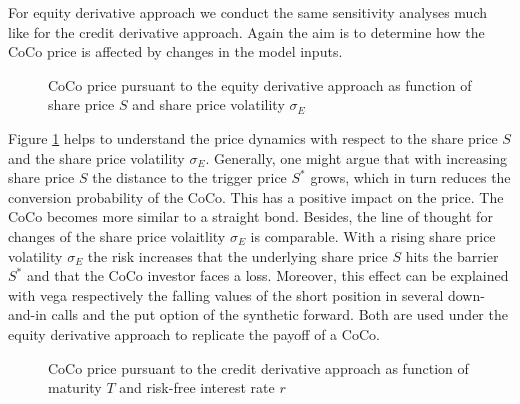 For equity derivative approach we conduct the same sensitivity analyses much like for the credit derivative approach. Again the aim is to determine how the CoCo price is affected by changes in the model inputs. 

\begin{figure}[H]
\centering
    \caption[CoCo price pursuant to the equity derivative approach as function of share price and share price volatility]{CoCo price pursuant to the equity derivative approach as function of share price $S$ and share price volatility $\sigma_E$}
  \label{fig:ed1}
  \end{figure}
  
Figure \ref{fig:ed1} helps to understand the price dynamics with respect to the share price $S$ and the share price volatility $\sigma_E$. Generally, one might argue that with increasing share price $S$ the distance to the trigger price $S^*$ grows, which in turn reduces the conversion probability of the CoCo. This has a positive impact on the price. The CoCo becomes more similar to a straight bond. Besides, the line of thought for changes of the share price volaitlity $\sigma_E$ is comparable. With a rising share price volatility $\sigma_E$ the risk increases that the underlying share price $S$ hits the barrier $S^*$ and that the CoCo investor faces a loss. Moreover, this effect can be explained with vega respectively the falling values of the short position in several down-and-in calls and the put option of the synthetic forward. Both are used under the equity derivative approach to replicate the payoff of a CoCo.

\begin{figure}[H]
\centering
{}
    \caption[CoCo price pursuant to the equity derivative approach as function of maturity and interest rate]{CoCo price pursuant to the credit derivative approach as function of maturity $T$ and risk-free interest rate $r$}
  \label{fig:ed2}
  \end{figure}

